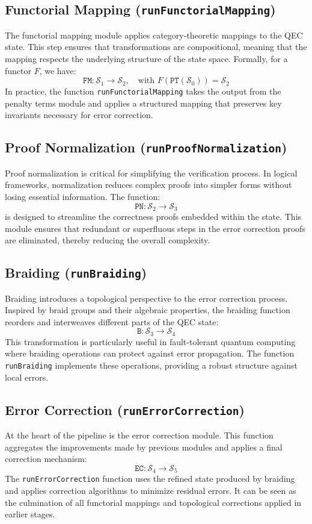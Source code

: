 \documentclass[11pt]{article}
\begin{document}
\subsection{Functorial Mapping (\texttt{runFunctorialMapping})}
The functorial mapping module applies category-theoretic mappings to the QEC state. This step ensures that transformations are compositional, meaning that the mapping respects the underlying structure of the state space. Formally, for a functor $F$, we have:
\[
\texttt{FM}: \mathcal{S}_1 \to \mathcal{S}_2, \quad \text{with } F(\texttt{PT}(\mathcal{S}_0)) = \mathcal{S}_2
\]
In practice, the function \texttt{runFunctorialMapping} takes the output from the penalty terms module and applies a structured mapping that preserves key invariants necessary for error correction.

\subsection{Proof Normalization (\texttt{runProofNormalization})}
Proof normalization is critical for simplifying the verification process. In logical frameworks, normalization reduces complex proofs into simpler forms without losing essential information. The function:
\[
\texttt{PN}: \mathcal{S}_2 \to \mathcal{S}_3
\]
is designed to streamline the correctness proofs embedded within the state. This module ensures that redundant or superfluous steps in the error correction proofs are eliminated, thereby reducing the overall complexity.

\subsection{Braiding (\texttt{runBraiding})}
Braiding introduces a topological perspective to the error correction process. Inspired by braid groups and their algebraic properties, the braiding function reorders and interweaves different parts of the QEC state:
\[
\texttt{B}: \mathcal{S}_3 \to \mathcal{S}_4
\]
This transformation is particularly useful in fault-tolerant quantum computing where braiding operations can protect against error propagation. The function \texttt{runBraiding} implements these operations, providing a robust structure against local errors.

\subsection{Error Correction (\texttt{runErrorCorrection})}
At the heart of the pipeline is the error correction module. This function aggregates the improvements made by previous modules and applies a final correction mechanism:
\[
\texttt{EC}: \mathcal{S}_4 \to \mathcal{S}_5
\]
The \texttt{runErrorCorrection} function uses the refined state produced by braiding and applies correction algorithms to minimize residual errors. It can be seen as the culmination of all functorial mappings and topological corrections applied in earlier stages.
\end{document}
